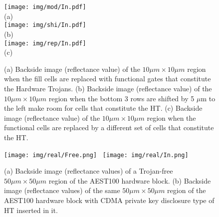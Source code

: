 \documentclass{beamer}
\begin{document}
\begin{columns}
\begin{column}[T]{0.33\textwidth}
                \begin{figure}[t]
                    \begin{columns}
                        \centering
                        \texttt{[image: img/mod/In.pdf]}\\
                        (a)\\
                        \texttt{[image: img/shi/In.pdf]}\\
                        (b)\\
                        \texttt{[image: img/rep/In.pdf]}\\
                        (c)
                        \caption{
                         (a) Backside image (reflectance value) of the $10\mu m
                        \times 10\mu m$ region when the fill cells are replaced
                        with functional gates that constitute the Hardware
                        Trojans.  (b) Backside image (reflectance value) of the
                        $10\mu m \times 10\mu m$ region when the bottom 3 rows
                        are shifted by 5 $\mu$m to the left make room for cells
                        that constitute the HT.  (c) Backside image (reflectance
                        value) of the $10\mu m \times 10\mu m$ region when the
                        functional cells are replaced by a different set of
                        cells that constitute the HT.}
                    \end{columns}
                \end{figure} 

                \begin{figure}[h]
                     \centering
                         \texttt{[image: img/real/Free.png]}~
                         \texttt{[image: img/real/In.png]}
                     \caption{
                         (a) Backside image (reflectance values) of a Trojan-free $50\mu m \times 50\mu
                         m$ region of the AEST100 hardware block.
                         (b) Backside image (reflectance values) of the same $50\mu m \times 50\mu
                         m$ region of the AEST100 hardware block with {\color{black}CDMA private
                         key disclosure} type of HT inserted in it.}
                     \label{imaging_result}
                 \end{figure}


\end{column}
\end{columns}
\end{document}

